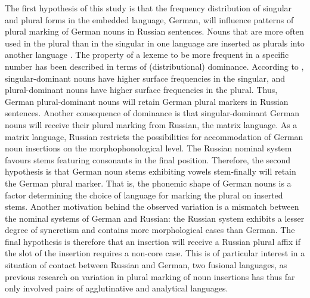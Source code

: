 The first hypothesis of this study is that the frequency distribution of singular and plural forms in the embedded language, German, will influence patterns of plural marking of German nouns in Russian sentences. Nouns that are more often used in the plural than in the singular in one language are inserted as plurals into another language \citep{backus-two-1996, backus-evidence-1999, backus-units-2003}. The property of a lexeme to be more frequent in a specific number has been described in terms of (distributional) dominance. According to \citet[][]{baayen-dijkstra-schreuder}, singular-dominant nouns have higher surface frequencies in the singular, and plural-dominant nouns have higher surface frequencies in the plural. Thus, German plural-dominant nouns will retain German plural markers in Russian sentences. Another consequence of dominance is that singular-dominant German nouns will receive their plural marking from Russian, the matrix language. As a matrix language, Russian restricts the possibilities for accommodation of German noun insertions on the morphophonological level. The Russian nominal system favours stems featuring consonants in the final position. Therefore, the second hypothesis is that German noun stems exhibiting vowels stem-finally will retain the German plural marker. That is, the phonemic shape of German nouns is a factor determining the choice of language for marking the plural on inserted stems. Another motivation behind the observed variation is a mismatch between the nominal systems of German and Russian: the Russian system exhibits a lesser degree of syncretism and contains more morphological cases than German. The final hypothesis is therefore that an insertion will receive a Russian plural affix if the slot of the insertion requires a non-core case. This is of particular interest in a situation of contact between Russian and German, two fusional languages, as previous research on variation in plural marking of noun insertions has thus far only involved pairs of agglutinative and analytical languages.

